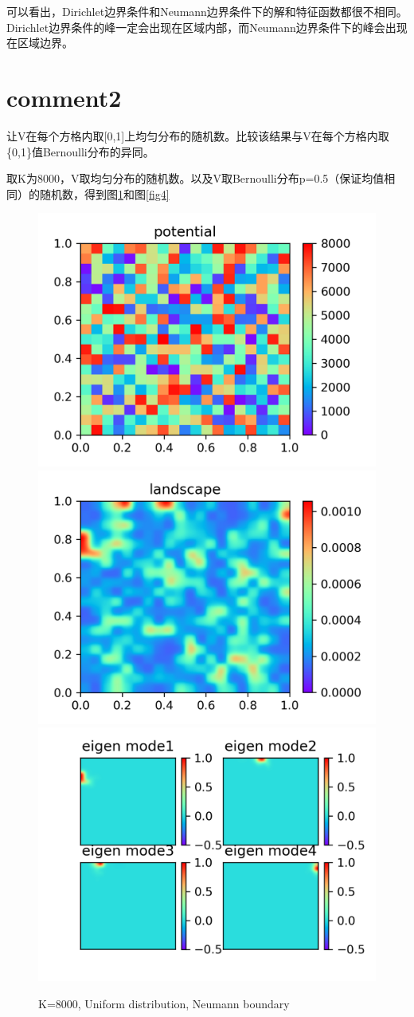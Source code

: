 \documentclass[UTF8,12pt]{article}
\begin{document}
可以看出，Dirichlet边界条件和Neumann边界条件下的解和特征函数都很不相同。Dirichlet边界条件的峰一定会出现在区域内部，而Neumann边界条件下的峰会出现在区域边界。

\section{comment2}

让V在每个方格内取[0,1]上均匀分布的随机数。比较该结果与V在每个方格内取\{0,1\}值Bernoulli分布的异同。

取K为8000，V取均匀分布的随机数。以及V取Bernoulli分布p=0.5（保证均值相同）的随机数，得到图\ref{fig3}和图\ref{fig4}

\begin{figure}[htbp]
    \centering
    \includegraphics[width=0.3\linewidth]{pic/v2}
    \includegraphics[width=0.3\linewidth]{pic/w2}
    \includegraphics[width=0.3\linewidth]{pic/u2}
    \caption{K=8000, Uniform distribution, Neumann boundary}
    \label{fig3}
\end{figure}
\end{document}
